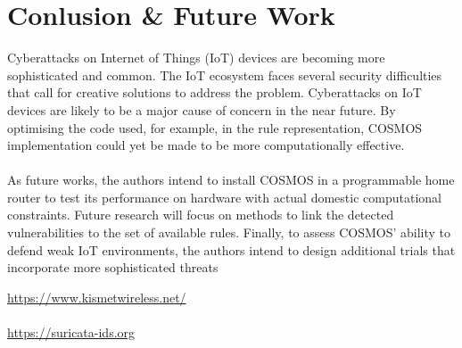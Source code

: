\documentclass[12pt]{report}
\begin{document}
\section{Conlusion \& Future Work}
\noindent
Cyberattacks on Internet of Things (IoT) devices are becoming more sophisticated and common. The IoT ecosystem faces several security difficulties that call for creative solutions to address the problem. Cyberattacks on IoT devices are likely to be a major cause of concern in the near future. By optimising the code used, for example, in the rule representation, COSMOS implementation could yet be made to be more computationally effective.
\\ \\
As future works, the authors intend to install COSMOS in a programmable home router to test its performance on hardware with actual domestic computational constraints. Future research will focus on methods to link the detected vulnerabilities to the set of available rules. Finally, to assess COSMOS' ability to defend weak IoT environments, the authors intend to design additional trials that incorporate more sophisticated threats


{}
\url{https://www.kismetwireless.net/}
\\ \\
\url{https://suricata-ids.org}
\end{document}
